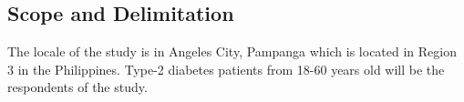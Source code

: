 \subsection*{Scope and Delimitation}
The locale of the study is in Angeles City, Pampanga which is located in Region
3 in the Philippines. Type-2 diabetes patients from 18-60 years old will be the
respondents of the study.
